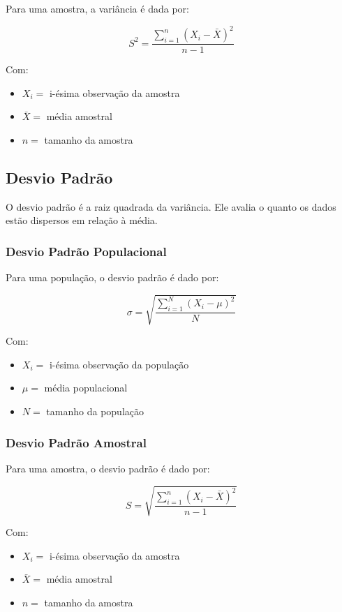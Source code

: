 \documentclass[
]{estat/estat}
\begin{document}
Para uma amostra, a variância é dada por:

\[S^2=\frac{\sum\limits_{i=1}^{n}\left(X_i - \bar{X}\right)^2}{n-1}\]

Com:

\begin{itemize}
\item
  \(X_i =\) i-ésima observação da amostra
\item
  \(\bar{X} =\) média amostral
\item
  \(n =\) tamanho da amostra
\end{itemize}

\subsection{Desvio Padrão}\label{desvio-padruxe3o}

O desvio padrão é a raiz quadrada da variância. Ele avalia o quanto os
dados estão dispersos em relação à média.

\subsubsection{Desvio Padrão
Populacional}\label{desvio-padruxe3o-populacional}

Para uma população, o desvio padrão é dado por:

\[\sigma=\sqrt{\frac{\sum\limits_{i=1}^{N}\left(X_i - \mu\right)^2}{N}}\]

Com:

\begin{itemize}
\item
  \(X_i =\) i-ésima observação da população
\item
  \(\mu =\) média populacional
\item
  \(N =\) tamanho da população
\end{itemize}

\subsubsection{Desvio Padrão Amostral}\label{desvio-padruxe3o-amostral}

Para uma amostra, o desvio padrão é dado por:

\[S=\sqrt{\frac{\sum\limits_{i=1}^{n}\left(X_i - \bar{X}\right)^2}{n-1}}\]

Com:

\begin{itemize}
\item
  \(X_i =\) i-ésima observação da amostra
\item
  \(\bar{X} =\) média amostral
\item
  \(n =\) tamanho da amostra
\end{itemize}
\end{document}
